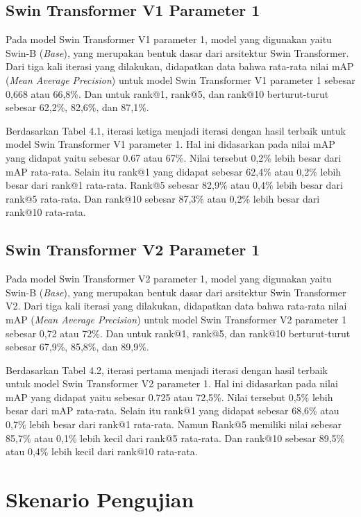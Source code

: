 \subsection{Swin Transformer V1 Parameter 1}

Pada model Swin Transformer V1 parameter 1, model yang digunakan yaitu Swin-B (\emph{Base}), yang merupakan bentuk 
dasar dari arsitektur Swin Transformer. Dari tiga kali iterasi yang dilakukan, didapatkan data bahwa rata-rata nilai 
mAP (\emph{Mean Average Precision}) untuk model Swin Transformer V1 parameter 1 sebesar 0,668 atau 66,8\%. Dan untuk 
rank@1, rank@5, dan rank@10 berturut-turut sebesar 62,2\%, 82,6\%, dan 87,1\%. 

Berdasarkan Tabel 4.1, iterasi ketiga menjadi iterasi dengan hasil terbaik untuk model Swin Transformer V1 parameter 1. 
Hal ini didasarkan pada nilai mAP yang didapat yaitu sebesar 0.67 atau 67\%. Nilai tersebut 0,2\% lebih besar dari 
mAP rata-rata. Selain itu rank@1 yang didapat sebesar 62,4\% atau 0,2\% lebih besar dari rank@1 rata-rata. Rank@5 sebesar 
82,9\% atau 0,4\% lebih besar dari rank@5 rata-rata. Dan rank@10 sebesar 87,3\% atau 0,2\% lebih besar dari rank@10 
rata-rata.

\subsection{Swin Transformer V2 Parameter 1}

Pada model Swin Transformer V2 parameter 1, model yang digunakan yaitu Swin-B (\emph{Base}), yang merupakan bentuk 
dasar dari arsitektur Swin Transformer V2. Dari tiga kali iterasi yang dilakukan, didapatkan data bahwa rata-rata nilai 
mAP (\emph{Mean Average Precision}) untuk model Swin Transformer V2 parameter 1 sebesar 0,72 atau 72\%. Dan untuk 
rank@1, rank@5, dan rank@10 berturut-turut sebesar 67,9\%, 85,8\%, dan 89,9\%. 

Berdasarkan Tabel 4.2, iterasi pertama menjadi iterasi dengan hasil terbaik untuk model Swin Transformer V2 parameter 1. 
Hal ini didasarkan pada nilai mAP yang didapat yaitu sebesar 0.725 atau 72,5\%. Nilai tersebut 0,5\% lebih besar dari 
mAP rata-rata. Selain itu rank@1 yang didapat sebesar 68,6\% atau 0,7\% lebih besar dari rank@1 rata-rata. Namun 
Rank@5 memiliki nilai sebesar 85,7\% atau 0,1\% lebih kecil dari rank@5 rata-rata. Dan rank@10 sebesar 89,5\% atau 0,4\% 
lebih kecil dari rank@10 rata-rata.

\section{Skenario Pengujian}
\label{sec:skenariopengujian}

